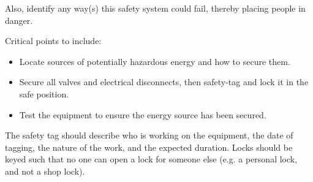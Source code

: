 Also, identify any way(s) this safety system could fail, thereby placing people in danger.

\vskip 50pt














Critical points to include:

\begin{itemize}
\item{} Locate sources of potentially hazardous energy and how to secure them.
\item{} Secure all valves and electrical disconnects, then safety-tag and lock it in the safe position.
\item{} Test the equipment to ensure the energy source has been secured.
\end{itemize}

The safety tag should describe who is working on the equipment, the date of tagging, the nature of the work, and the expected duration.  Locks should be keyed such that no one can open a lock for someone else (e.g. a personal lock, and not a shop lock).




